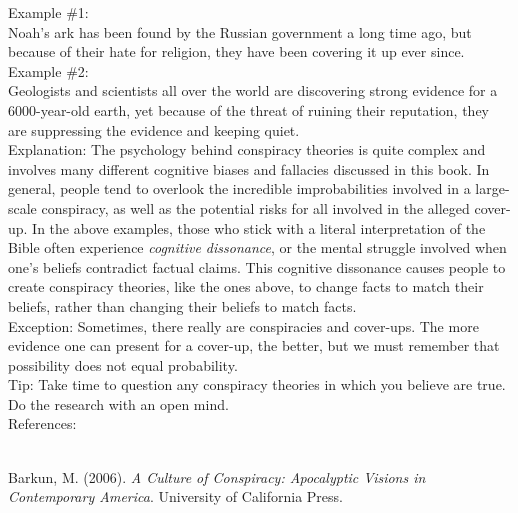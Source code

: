 \documentclass[a4paper,12pt,single,pdftex]{scrartcl}
\begin{document}
    
      Example \#1:
    \\

    
      Noah’s ark has been found by the Russian government a long time ago, but because of their hate for religion, they have been covering it up ever since.
    \\

    
      Example \#2:
    \\

    
      Geologists and scientists all over the world are discovering strong evidence for a 6000-year-old earth, yet because of the threat of ruining their reputation, they are suppressing the evidence and keeping quiet.
    \\

    
      Explanation: The psychology behind conspiracy theories is quite complex and involves many different cognitive biases and fallacies discussed in this book.  In general, people tend to overlook the incredible improbabilities involved in a large-scale conspiracy, as well as the potential risks for all involved in the alleged cover-up.  In the above examples, those who stick with a literal interpretation of the Bible often experience {\it cognitive dissonance}, or the mental struggle involved when one’s beliefs contradict factual claims.  This cognitive dissonance causes people to create conspiracy theories, like the ones above, to change facts to match their beliefs, rather than changing their beliefs to match facts.
    \\

    
      Exception: Sometimes, there really are conspiracies and cover-ups.  The more evidence one can present for a cover-up, the better, but we must remember that possibility does not equal probability.
    \\

    
      Tip: Take time to question any conspiracy theories in which you believe are true.  Do the research with an open mind.
    \\

    References:

    
      
        
      \\

      
        
          Barkun, M. (2006). {\it A Culture of Conspiracy: Apocalyptic Visions in Contemporary America}. University of California Press.
        
      
    
\end{document}
